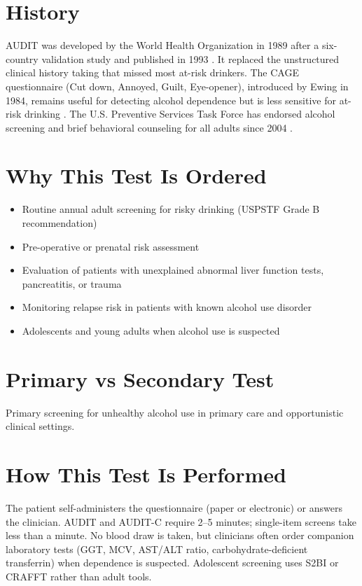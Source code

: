 \section*{History}
AUDIT was developed by the World Health Organization in 1989 after a six-country validation study and published in 1993 \cite{saunders1993development}. It replaced the unstructured clinical history taking that missed most at-risk drinkers. The CAGE questionnaire (Cut down, Annoyed, Guilt, Eye-opener), introduced by Ewing in 1984, remains useful for detecting alcohol dependence but is less sensitive for at-risk drinking \cite{ewing1984detecting}. The U.S. Preventive Services Task Force has endorsed alcohol screening and brief behavioral counseling for all adults since 2004 \cite{uspstf2018alcohol}.

\section*{Why This Test Is Ordered}
\begin{itemize}
  \item Routine annual adult screening for risky drinking (USPSTF Grade B recommendation)
  \item Pre-operative or prenatal risk assessment
  \item Evaluation of patients with unexplained abnormal liver function tests, pancreatitis, or trauma
  \item Monitoring relapse risk in patients with known alcohol use disorder
  \item Adolescents and young adults when alcohol use is suspected
\end{itemize}

\section*{Primary vs Secondary Test}
Primary screening for unhealthy alcohol use in primary care and opportunistic clinical settings.

\section*{How This Test Is Performed}
The patient self-administers the questionnaire (paper or electronic) or answers the clinician. AUDIT and AUDIT-C require 2--5 minutes; single-item screens take less than a minute. No blood draw is taken, but clinicians often order companion laboratory tests (GGT, MCV, AST/ALT ratio, carbohydrate-deficient transferrin) when dependence is suspected. Adolescent screening uses S2BI or CRAFFT rather than adult tools.

